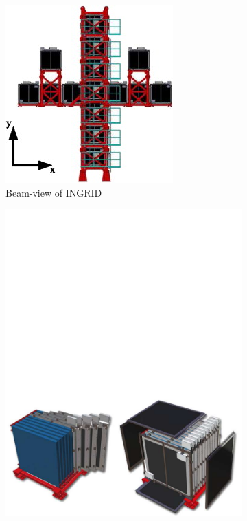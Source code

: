 \begin{figure}[h]
	\begin{subfigure}[t]{0.47\textwidth}
		\includegraphics[width=\textwidth, trim={0mm 0mm 0mm 0mm}, clip,page=1]{figures/det_chap/ingrid/ingrid}
		\caption{Beam-view of INGRID}
	\end{subfigure}	
	\begin{subfigure}[t]{0.47\textwidth}
		\includegraphics[width=\textwidth, trim={0mm 0mm 0mm 50mm}, clip,page=1]{figures/det_chap/ingrid/ingrid_module}

\end{subfigure}
\end{figure}
